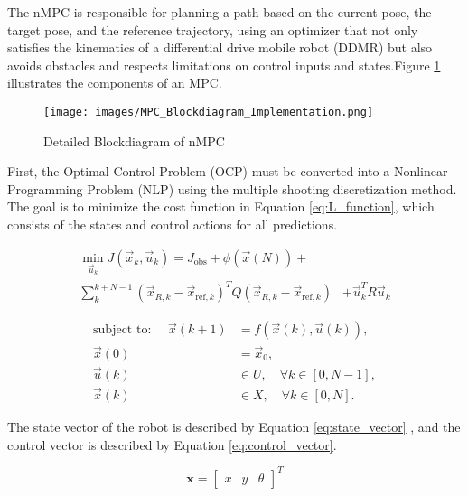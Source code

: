 \documentclass[conference]{IEEEtran}
\begin{document}
The nMPC is responsible for planning a path based on the current pose, the target pose, and the reference trajectory, using an optimizer that not only satisfies the kinematics of a differential drive mobile robot (DDMR) but also avoids obstacles and respects limitations on control inputs and states.Figure \ref{fig:MPC_Blockdiagram_Implementation} illustrates the components of an MPC.

\begin{figure}[!h]
    \centering
    \texttt{[image: images/MPC\_Blockdiagram\_Implementation.png]}
    \caption{Detailed Blockdiagram of nMPC \cite{Effects_of_roll_dynamics_for_car_stability_control_by_laguerre_functions}}
    \label{fig:MPC_Blockdiagram_Implementation}
\end{figure}

First, the Optimal Control Problem (OCP) must be converted into a Nonlinear Programming Problem (NLP) using the multiple shooting discretization method. The goal is to minimize the cost function in Equation \ref{eq:L_function}, which consists of the states and control actions for all predictions.

\begin{equation}
\label{eq:L_function}
\begin{aligned}
\min_{\vec{u}_k} J(\vec{x}_k, \vec{u}_k) = J_{\text{obs}} + \phi(\vec{x}(N)) 
+ &\\ \sum_{k}^{k+N-1}
(\vec{x}_{R,k} - \vec{x}_{\text{ref},k})^T Q (\vec{x}_{R,k} - \vec{x}_{\text{ref},k})&+ \vec{u}_k^T R \vec{u}_k
\end{aligned}
\end{equation}


\begin{align}
\text{subject to: } \quad \vec{x}(k+1) &= f(\vec{x}(k), \vec{u}(k)), \\
\vec{x}(0) &= \vec{x}_0, \\
\vec{u}(k) &\in U, \quad \forall k \in [0, N-1], \\
\vec{x}(k) &\in X, \quad \forall k \in [0, N].
\end{align}

The state vector of the robot is described by Equation \ref{eq:state_vector} , and the control vector is described by Equation \ref{eq:control_vector}. 

\begin{equation}\label{eq:state_vector}
    \mathbf{x} = \begin{bmatrix} x & y & \theta \end{bmatrix}^T
\end{equation}
\end{document}
